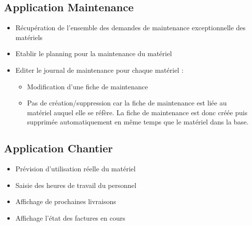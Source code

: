\documentclass [a4paper] {report}
\begin{document}
\subsection{Application Maintenance}
\begin{itemize}
\item Récupération de l'ensemble des demandes de maintenance exceptionnelle des matériels
\item Etablir le planning pour la maintenance du matériel
\item Editer le journal de maintenance pour chaque matériel :
    \begin{itemize}
    \item Modification d'une fiche de maintenance %
    \item Pas de création/suppression car la fiche de maintenance est liée
    au matériel auquel elle se réfère. La fiche de maintenance est donc
    créée puis supprimée automatiquement en même temps que le matériel dans
    la base.
    \end{itemize}


\end{itemize}

\subsection{Application Chantier}
\begin{itemize}
\item Prévision d'utilisation réelle du matériel
\item Saisie des heures de travail du personnel
\item Affichage de prochaines livraisons
\item Affichage l'état des factures en cours
\end{itemize}

\end{document}
